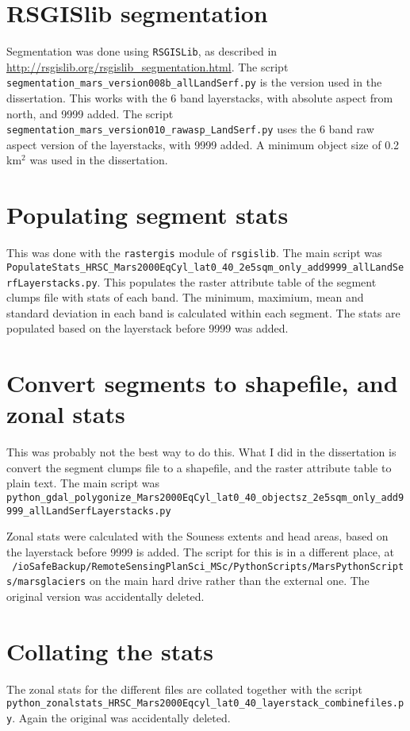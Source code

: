 \documentclass[a4paper,12pt]{article}
\begin{document}
\section{RSGISlib segmentation}
Segmentation was done using {\tt RSGISLib}, as described in \href{http://rsgislib.org/rsgislib\_segmentation.html}{http://rsgislib.org/rsgislib\_segmentation.html}. The script {\tt segmentation\_mars\_version008b\_allLandSerf.py} is the version used in the dissertation. This works with the 6 band layerstacks, with absolute aspect from north, and 9999 added. The script {\tt segmentation\_mars\_version010\_rawasp\_LandSerf.py} uses the 6 band raw aspect version of the layerstacks, with 9999 added.
A minimum object size of 0.2 km$^2$ was used in the dissertation.
\section{Populating segment stats}
This was done with the {\tt rastergis} module of {\tt rsgislib}. The main script was {\tt PopulateStats\_HRSC\_Mars2000EqCyl\_lat0\_40\_2e5sqm\_only\_add9999\_allLandSerfLayerstacks.py}. This populates the raster attribute table of the segment clumps file with stats of each band. The minimum, maximium, mean and standard deviation in each band is calculated within each segment. The stats are populated based on the layerstack before 9999 was added.
\section{Convert segments to shapefile, and zonal stats}
This was probably not the best way to do this. What I did in the dissertation is convert the segment clumps file to a shapefile, and the raster attribute table to plain text. The main script was {\tt python\_gdal\_polygonize\_Mars2000EqCyl\_lat0\_40\_objectsz\_2e5sqm\_only\_add9999\_allLandSerfLayerstacks.py}

Zonal stats were calculated with the Souness extents and head areas, based on the layerstack before 9999 is added. The script for this is in a different place, at {\tt ~/ioSafeBackup/RemoteSensingPlanSci\_MSc/PythonScripts/MarsPythonScripts/marsglaciers} on the main hard drive rather than the external one. The original version was accidentally deleted. 


\section{Collating the stats}
The zonal stats for the different files are collated together with the script {\tt python\_zonalstats\_HRSC\_Mars2000Eqcyl\_lat0\_40\_layerstack\_combinefiles.py}. Again the original was accidentally deleted.
\end{document}
